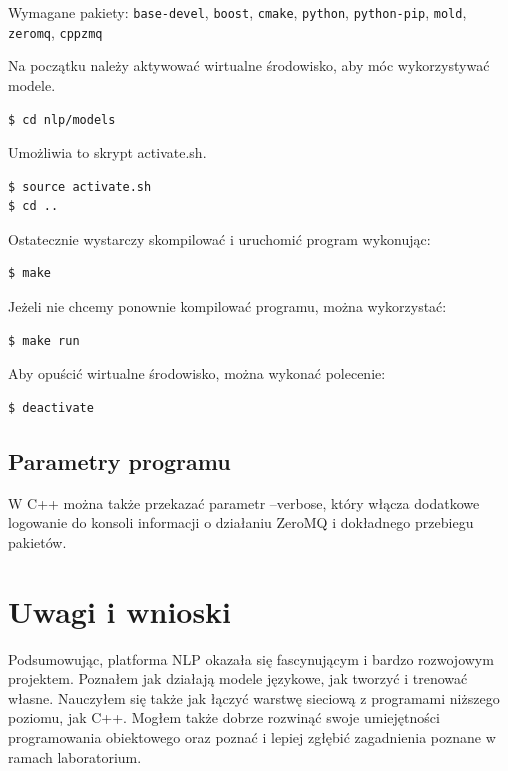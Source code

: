 \documentclass{article}
\begin{document}
Wymagane pakiety: \texttt{base-devel}, \texttt{boost}, \texttt{cmake}, \texttt{python}, \texttt{python-pip}, \texttt{mold}, \texttt{zeromq}, \texttt{cppzmq}

\noindent Na początku należy aktywować wirtualne środowisko, aby móc wykorzystywać modele.

\begin{lstlisting}
$ cd nlp/models
\end{lstlisting}

\noindent Umożliwia to skrypt activate.sh.

\begin{lstlisting}
$ source activate.sh
$ cd ..
\end{lstlisting}

\noindent Ostatecznie wystarczy skompilować i uruchomić program wykonując:

\begin{lstlisting}
$ make
\end{lstlisting}

\noindent Jeżeli nie chcemy ponownie kompilować programu, można wykorzystać:

\begin{lstlisting}
$ make run
\end{lstlisting}

\noindent Aby opuścić wirtualne środowisko, można wykonać polecenie:

\begin{lstlisting}
$ deactivate
\end{lstlisting}

\subsection{Parametry programu}

W C++ można także przekazać parametr --verbose, który włącza dodatkowe logowanie do konsoli informacji o działaniu ZeroMQ i dokładnego przebiegu pakietów.

\section{Uwagi i wnioski}

Podsumowując, platforma NLP okazała się fascynującym i bardzo rozwojowym projektem. Poznałem jak działają modele językowe, jak tworzyć i trenować własne. Nauczyłem się także jak łączyć warstwę sieciową z programami niższego poziomu, jak C++. Mogłem także dobrze rozwinąć swoje umiejętności programowania obiektowego oraz poznać i lepiej zgłębić zagadnienia poznane w ramach laboratorium.
\end{document}
